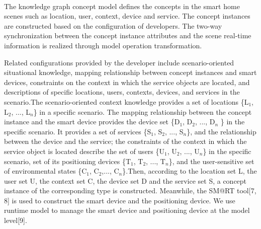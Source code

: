 \paragraph{}
The knowledge graph concept model defines the concepts in the smart home scenes such as location, user, context, device and service. The concept instances are constructed based on the configuration of developers. The two-way synchronization between the concept instance attributes and the scene real-time information is realized through model operation transformation.



Related configurations provided by the developer include scenario-oriented situational knowledge, mapping relationship between concept instances and smart devices, constraints on the context in which the service objects are located, and descriptions of specific locations, users, contexts, devices, and services in the scenario.The scenario-oriented context knowledge provides a set of locations \{L$_{1}$, L$_{2}$, ..., L$_{n}$\} in a specific scenario. The mapping relationship between the concept instance and the smart device provides the device set \{D$_{1}$, D$_{2}$, ..., D$_{n}$ \} in the specific scenario. It provides a set of services \{S$_{1}$, S$_{2}$, ..., S$_{n}$\}, and the relationship between the device and the service; the constraints of the context in which the service object is located describe the set of users \{U$_{1}$, U$_{2}$, ..., U$_{n}$\} in the specific scenario, set of its positioning devices \{T$_{1}$, T$_{2}$, ..., T$_{n}$\}, and the user-sensitive set of environmental states \{C$_{1}$, C$_{2}$,..., C$_{n}$\}.Then, according to the location set L, the user set U, the context set C, the device set D and the service set S, a concept instance of the corresponding type is constructed. Meanwhile, the SM@RT tool[7, 8] is used to construct the smart device and the positioning device. We use runtime model to manage the smart device and positioning device at the model level[9].

